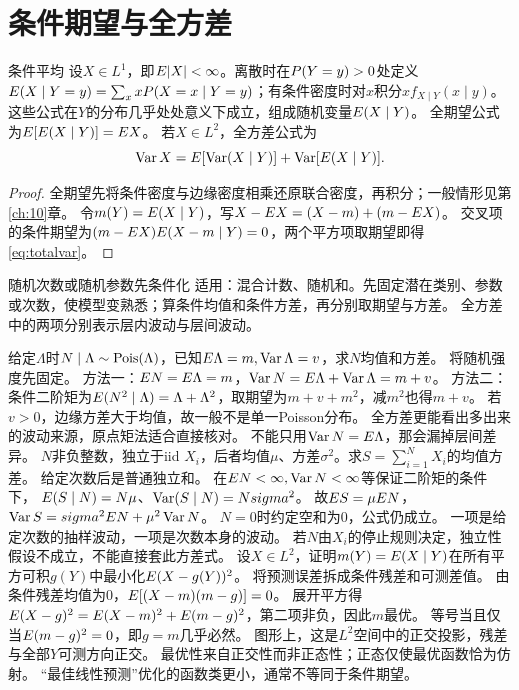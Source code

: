 \section{条件期望与全方差}\label{sec:44}
\begin{definition}{条件平均}
设$X\in L^1$，即$E|X|<\infty$。离散时在$P(Y=y)>0$处定义$E(X\mid Y=y)=\sum_xxP(X=x\mid Y=y)$；有条件密度时对$x$积分$x f_{X\mid Y}(x\mid y)$。
这些公式在$Y$的分布几乎处处意义下成立，组成随机变量$E(X\mid Y)$。
全期望公式为$E[E(X\mid Y)]=E X$。
若$X\in L^2$，全方差公式为
\begin{equation}\operatorname{Var} X=E[\operatorname{Var}(X\mid Y)]+\operatorname{Var}[E(X\mid Y)].\label{eq:totalvar}\end{equation}
\end{definition}
\begin{proof}
全期望先将条件密度与边缘密度相乘还原联合密度，再积分；一般情形见第\ref{ch:10}章。
令$m(Y)=E(X\mid Y)$，写$X-E X=(X-m)+(m-E X)$。
交叉项的条件期望为$(m-E X)E(X-m\mid Y)=0$，两个平方项取期望即得\eqref{eq:totalvar}。
\end{proof}
\begin{method}{随机次数或随机参数先条件化}
适用：混合计数、随机和。先固定潜在类别、参数或次数，使模型变熟悉；算条件均值和条件方差，再分别取期望与方差。
全方差中的两项分别表示层内波动与层间波动。
\end{method}
{给定$\Lambda$时$N\mid\Lambda\sim\operatorname{Pois}(\Lambda)$，已知$E\Lambda=m,\operatorname{Var}\Lambda=v$，求$N$均值和方差。}
{将随机强度先固定。}
{方法一：$E N=E\Lambda=m$，$\operatorname{Var} N=E\Lambda+\operatorname{Var}\Lambda=m+v$。
方法二：条件二阶矩为$E(N^2\mid\Lambda)=\Lambda+\Lambda^2$，取期望为$m+v+m^2$，减$m^2$也得$m+v$。
若$v>0$，边缘方差大于均值，故一般不是单一Poisson分布。}
{全方差更能看出多出来的波动来源，原点矩法适合直接核对。}
{不能只用$\operatorname{Var} N=E\Lambda$，那会漏掉层间差异。}
{$N$非负整数，独立于iid $X_i$，后者均值$\mu$、方差$\sigma^2$。求$S=\sum_{i=1}^NX_i$的均值方差。}
{给定次数后是普通独立和。}
{在$E N<\infty,\operatorname{Var} N<\infty$等保证二阶矩的条件下，
$E(S\mid N)=N\mu$、$\operatorname{Var}(S\mid N)=Nsigma^2$。
故$E S=\mu E N$，$\operatorname{Var} S=sigma^2E N+\mu^2\operatorname{Var} N$。
$N=0$时约定空和为0，公式仍成立。}
{一项是给定次数的抽样波动，一项是次数本身的波动。}
{若$N$由$X_i$的停止规则决定，独立性假设不成立，不能直接套此方差式。}
{设$X\in L^2$，证明$m(Y)=E(X\mid Y)$在所有平方可积$g(Y)$中最小化$E(X-g(Y))^2$。}
{将预测误差拆成条件残差和可测差值。}
{由条件残差均值为0，$E[(X-m)(m-g)]=0$。
展开平方得$E(X-g)^2=E(X-m)^2+E(m-g)^2$，第二项非负，因此$m$最优。
等号当且仅当$E(m-g)^2=0$，即$g=m$几乎必然。
图形上，这是$L^2$空间中的正交投影，残差与全部$Y$可测方向正交。}
{最优性来自正交性而非正态性；正态仅使最优函数恰为仿射。}
{“最佳线性预测”优化的函数类更小，通常不等同于条件期望。}

